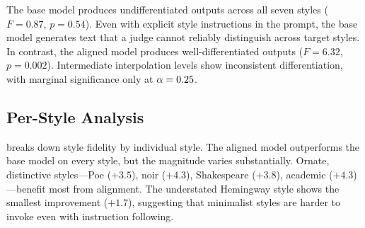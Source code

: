 The base model produces undifferentiated outputs across all seven styles ($F =
0.87$, $p = 0.54$). Even with explicit style instructions in the prompt, the base
model generates text that a \gptjudge judge cannot reliably distinguish across
target styles. In contrast, the aligned model produces well-differentiated outputs
($F = 6.32$, $p = 0.002$). Intermediate interpolation levels show inconsistent
differentiation, with marginal significance only at $\alpha = 0.25$.

\subsection{Per-Style Analysis}
\label{sec:perstyle}

 breaks down style fidelity by individual style.
The aligned model outperforms the base model on every style, but the magnitude
varies substantially. Ornate, distinctive styles---Poe ($+3.5$), noir ($+4.3$),
Shakespeare ($+3.8$), academic ($+4.3$)---benefit most from alignment. The
understated Hemingway style shows the smallest improvement ($+1.7$), suggesting
that minimalist styles are harder to invoke even with instruction following.

\begin{table}[t]
    \centering
    \renewcommand{\arraystretch}{1.25}
    \caption{Style fidelity by individual style across conditions. The $\Delta$
    column shows the improvement from base to aligned. Ornate styles (Poe, noir,
    academic) benefit most from alignment; understated Hemingway shows the
    smallest gain.}
    \label{tab:perstyle}
\end{table}

